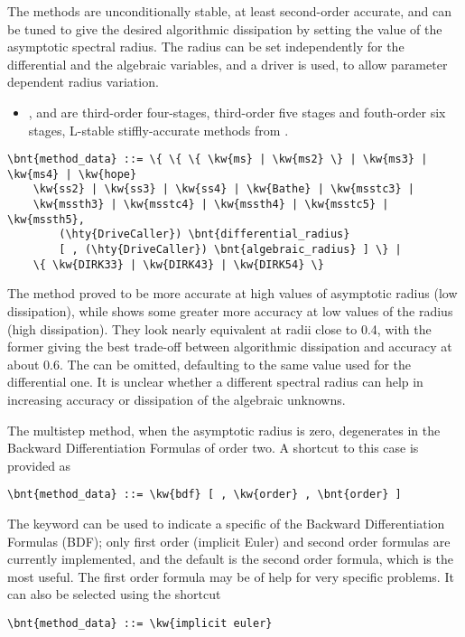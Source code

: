 The methods are unconditionally stable, at least second-order accurate, and can be tuned to give 
the desired algorithmic dissipation
by setting the value of the asymptotic spectral radius.
The radius can be set independently for the differential
and the algebraic variables, and a driver is used, to allow parameter 
dependent radius variation.
\begin{itemize}
\item {},  and  are third-order  four-stages, third-order 
five stages and fouth-order six stages, L-stable stiffly-accurate methods from 
\cite{kennedy_diagonally_2019}.
\end{itemize}
\begin{Verbatim}[commandchars=\\\{\}]
    \bnt{method_data} ::= \{ \{ \{ \kw{ms} | \kw{ms2} \} | \kw{ms3} | \kw{ms4} | \kw{hope} 
    \kw{ss2} | \kw{ss3} | \kw{ss4} | \kw{Bathe} | \kw{msstc3} | 
    \kw{mssth3} | \kw{msstc4} | \kw{mssth4} | \kw{msstc5} | \kw{mssth5},
        (\hty{DriveCaller}) \bnt{differential_radius}
        [ , (\hty{DriveCaller}) \bnt{algebraic_radius} ] \} | 
    \{ \kw{DIRK33} | \kw{DIRK43} | \kw{DIRK54} \}
\end{Verbatim}
The  method proved to be more accurate at high values of asymptotic
radius (low dissipation), while  shows some greater more accuracy
at low values of the radius (high dissipation).
They look nearly equivalent at radii close to 0.4, with the former
giving the best trade-off between algorithmic dissipation and accuracy 
at about 0.6.
The  can be omitted, defaulting to the same value used for 
the differential one.
It is unclear whether a different spectral radius can help in increasing
accuracy or dissipation of the algebraic unknowns.

\noindent
The multistep method, when the asymptotic radius is zero, degenerates
in the Backward Differentiation Formulas of order two.
A shortcut to this case is provided as
\begin{Verbatim}[commandchars=\\\{\}]
    \bnt{method_data} ::= \kw{bdf} [ , \kw{order} , \bnt{order} ]
\end{Verbatim}
The keyword  can be used to indicate a specific 
of the Backward Differentiation Formulas (BDF); only first order (implicit Euler) and 
second order formulas are currently implemented, and the default
is the second order formula, which is the most useful.
The first order formula may be of help for very specific problems.
It can also be selected using the shortcut
\begin{Verbatim}[commandchars=\\\{\}]
    \bnt{method_data} ::= \kw{implicit euler}
\end{Verbatim}

